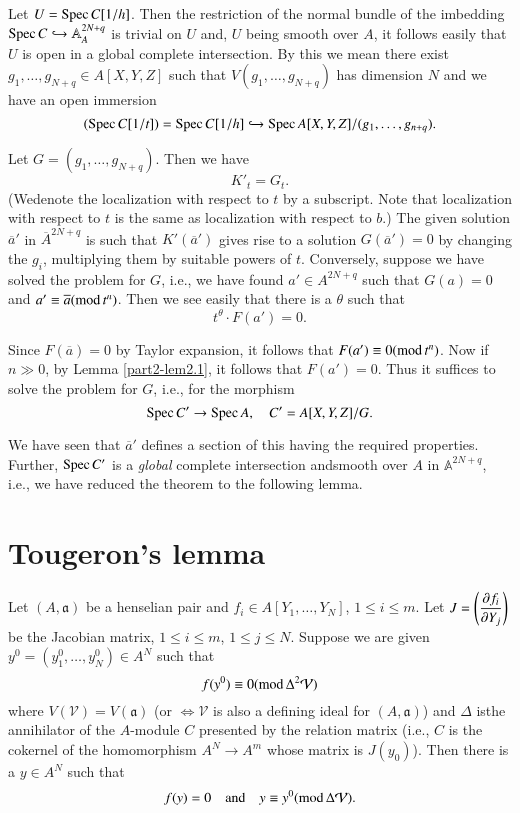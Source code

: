 Let $U=\operatorname{Spec} C[1/h]$. Then the restriction of the normal bundle of the
imbedding $\operatorname{Spec} C\hookrightarrow \mathbb{A}^{2N+q}_{A}$ is trivial on
$U$ and, $U$ being smooth over $A$, it follows easily that $U$ is open
in a global complete intersection. By this we mean there exist
$g_{1},\ldots,g_{N+q}\in A[X,Y,Z]$ such that $V(g_{1},\ldots,g_{N+q})$
has dimension $N$ and we have an open immersion
$$
(\operatorname{Spec} C[1/t])=\operatorname{Spec} C[1/h]\hookrightarrow \operatorname{Spec}
A[X,Y,Z]/(g_{1},\ldots,g_{n+q}).
$$

Let $G=(g_{1},\ldots,g_{N+q})$. Then we have
$$
K'_{t}=G_{t}.
$$
(We\pageoriginale denote the localization with respect to $t$ by a
subscript. Note that localization with respect to $t$ is the same as
localization with respect to $b$.) The given solution $\overline{a}'$
in $\overline{A}^{2N+q}$ is such that $K'(\overline{a}')$ gives rise
to a solution $G(\overline{a}')=0$ by changing the $g_{i}$,
multiplying them by suitable powers of $t$. Conversely, suppose we
have solved the problem for $G$, i.e., we have found $a'\in A^{2N+q}$
such that $G(a)=0$ and $a'\equiv
\overline{a}(\text{mod\,}t^{n})$. Then we see easily that there is a
$\theta$ such that
$$
t^{\theta}\cdot F(a')=0.
$$

Since $F(\overline{a})=0$ by Taylor expansion, it follows that
$F(a')\equiv 0\break(\text{mod\,}t^{n})$. Now if $n\gg 0$, by Lemma
\ref{part2-lem2.1}, it follows that $F(a')=0$. Thus it suffices to
solve the problem for $G$, i.e., for the morphism
$$
\operatorname{Spec} C'\to \operatorname{Spec} A,\quad C'=A[X,Y,Z]/G.
$$

We have seen that $\overline{a}'$ defines a section of this having the
required properties. Further, $\operatorname{Spec} C'$ is a {\em global} complete
intersection and\break smooth over $A$ in $\mathbb{A}^{2N+q}$, i.e.,
we have reduced the theorem to the following lemma. 

\section{Tougeron's lemma}\label{part2-sec4}

\begin{lemma}\label{part2-lem4.1}
Let $(A,\mathfrak{a})$ be a henselian pair and $f_{i}\in
A[Y_{1},\ldots,Y_{N}]$, $1\leq i\leq m$. Let $J=\left(\dfrac{\partial
  f_{i}}{\partial Y_{j}}\right)$ be the Jacobian matrix, $1\leq i\leq m$,
$1\leq j\leq N$. Suppose we are given
$y^{0}=(y^{0}_{1},\ldots,y^{0}_{N})\in A^{N}$ such that
$$
f(y^{0})\equiv 0(\text{mod\,}\Delta^{2}\mathcal{V})
$$
where $V(\mathcal{V})=V(\mathfrak{a})$ (or $\Leftrightarrow
\mathcal{V}$ is also a defining ideal for $(A,\mathfrak{a})$) and
$\Delta$ is\pageoriginale the annihilator of the $A$-module $C$
presented by the relation matrix (i.e., $C$ is the cokernel of the
homomorphism $A^{N}\to A^{m}$ whose matrix is $J(y_{0})$). Then there
is a $y\in A^{N}$ such that
$$
f(y)=0\quad\text{and}\quad y\equiv y^{0}(\text{\rm
  mod\,}\Delta\mathcal{V}). 
$$
\end{lemma}

